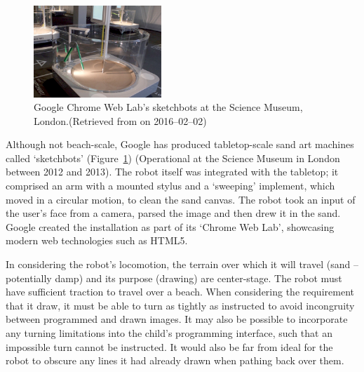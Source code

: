     \begin{figure}
      \begin{center}
        \includegraphics[width=0.43\textwidth]{Files/sketchbots}
      \end{center}
      \caption{Google Chrome Web Lab's sketchbots at the Science Museum, London.{\small (Retrieved from  on 2016--02--02)}}
      \label{fig: sketchbots}
    \end{figure}
    Although not beach-scale, Google has produced tabletop-scale sand art machines called `sketchbots' (Figure~\ref{fig: sketchbots}) (Operational at the Science Museum in London between 2012 and 2013).\cite{Warman2012} The robot itself was integrated with the tabletop; it comprised an arm with a mounted stylus and a `sweeping' implement, which moved in a circular motion, to clean the sand canvas. The robot took an input of the user's face from a camera, parsed the image and then drew it in the sand. Google  created the installation as part of its `Chrome Web Lab', showcasing modern web technologies such as HTML5.

    In considering the robot's locomotion, the terrain over which it will travel (sand -- potentially damp) and its purpose (drawing) are center-stage. The robot must have sufficient traction to travel over a beach. When considering the requirement that it draw, it must be able to turn as tightly as instructed to avoid incongruity between programmed and drawn images. It may also be possible to incorporate any turning limitations into the child's programming interface, such that an impossible turn cannot be instructed. It would also be far from ideal for the robot to obscure any lines it had already drawn when pathing back over them.

